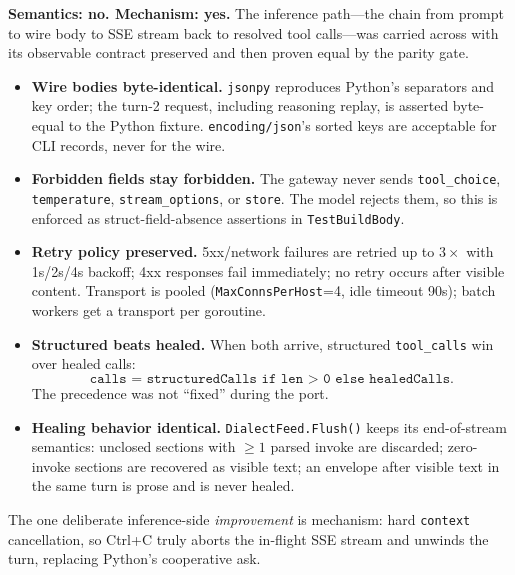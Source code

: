 \documentclass[11pt,a4paper]{article}
\newcommand{\py}[1]{\textcolor{pyblue}{\texttt{#1}}}
\newcommand{\go}[1]{\textcolor{gogreen}{\texttt{#1}}}
\begin{document}
\noindent
\textbf{Semantics: no. Mechanism: yes.} The inference path---the chain from prompt to wire body to SSE stream back to resolved tool calls---was carried across with its observable contract preserved and then proven equal by the parity gate.

\begin{itemize}[leftmargin=*,itemsep=0.35em]
  \item \textbf{Wire bodies byte-identical.} \py{jsonpy} reproduces Python's separators and key order; the turn-2 request, including reasoning replay, is asserted byte-equal to the Python fixture. \texttt{encoding/json}'s sorted keys are acceptable for CLI records, never for the wire.
  \item \textbf{Forbidden fields stay forbidden.} The gateway never sends \texttt{tool\_choice}, \texttt{temperature}, \texttt{stream\_options}, or \texttt{store}. The model rejects them, so this is enforced as struct-field-absence assertions in \go{TestBuildBody}.
  \item \textbf{Retry policy preserved.} 5xx/network failures are retried up to $3\times$ with 1s/2s/4s backoff; 4xx responses fail immediately; no retry occurs after visible content. Transport is pooled (\texttt{MaxConnsPerHost}=4, idle timeout 90s); batch workers get a transport per goroutine.
  \item \textbf{Structured beats healed.} When both arrive, structured \texttt{tool\_calls} win over healed calls:
  \[
    \texttt{calls = structuredCalls if len > 0 else healedCalls}.
  \]
  The precedence was not ``fixed'' during the port.
  \item \textbf{Healing behavior identical.} \texttt{DialectFeed.Flush()} keeps its end-of-stream semantics: unclosed sections with $\geq 1$ parsed invoke are discarded; zero-invoke sections are recovered as visible text; an envelope after visible text in the same turn is prose and is never healed.
\end{itemize}

\noindent
The one deliberate inference-side \emph{improvement} is mechanism: hard \texttt{context} cancellation, so Ctrl+C truly aborts the in-flight SSE stream and unwinds the turn, replacing Python's cooperative ask.
\end{document}

